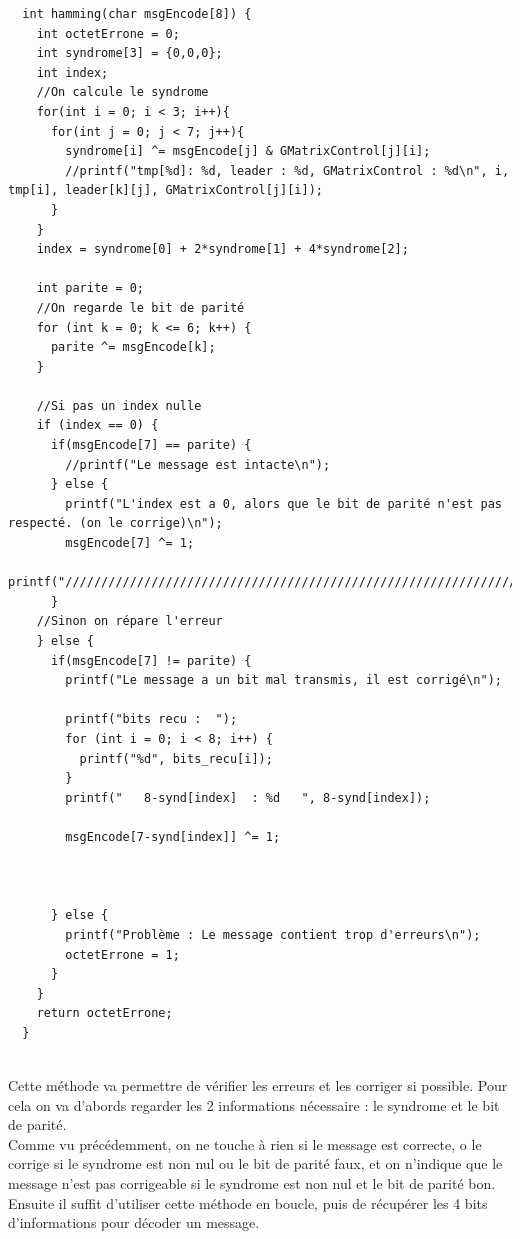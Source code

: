 \documentclass[12pt]{article}
\begin{document}
\begin{verbatim}
  int hamming(char msgEncode[8]) {
    int octetErrone = 0;
    int syndrome[3] = {0,0,0};
    int index;
    //On calcule le syndrome
    for(int i = 0; i < 3; i++){
      for(int j = 0; j < 7; j++){
        syndrome[i] ^= msgEncode[j] & GMatrixControl[j][i];
        //printf("tmp[%d]: %d, leader : %d, GMatrixControl : %d\n", i, tmp[i], leader[k][j], GMatrixControl[j][i]);
      }
    }
    index = syndrome[0] + 2*syndrome[1] + 4*syndrome[2];

    int parite = 0;
    //On regarde le bit de parité
    for (int k = 0; k <= 6; k++) {
      parite ^= msgEncode[k];
    }

    //Si pas un index nulle
    if (index == 0) {
      if(msgEncode[7] == parite) {
        //printf("Le message est intacte\n");
      } else {
        printf("L'index est a 0, alors que le bit de parité n'est pas respecté. (on le corrige)\n");
        msgEncode[7] ^= 1;
        printf("/////////////////////////////////////////////////////////////////////////");
      }
    //Sinon on répare l'erreur
    } else {
      if(msgEncode[7] != parite) {
        printf("Le message a un bit mal transmis, il est corrigé\n");

        printf("bits recu :  ");
        for (int i = 0; i < 8; i++) {
          printf("%d", bits_recu[i]);
        }
        printf("   8-synd[index]  : %d   ", 8-synd[index]);

        msgEncode[7-synd[index]] ^= 1;



      } else {
        printf("Problème : Le message contient trop d'erreurs\n");
        octetErrone = 1;
      }
    }
    return octetErrone;
  }


\end{verbatim}
 
Cette méthode va permettre de vérifier les erreurs et les corriger si possible. Pour cela on va d’abords regarder les 2 informations nécessaire : le syndrome et le bit de parité.\\
Comme vu précédemment, on ne touche à rien si le message est correcte, o le corrige si le syndrome est non nul ou le bit de parité faux, et on n’indique que le message n’est pas corrigeable si le syndrome est non nul et le bit de parité bon.\\

Ensuite il suffit d’utiliser cette méthode en boucle, puis de récupérer les 4 bits d'informations pour décoder un message.\\
\end{document}
